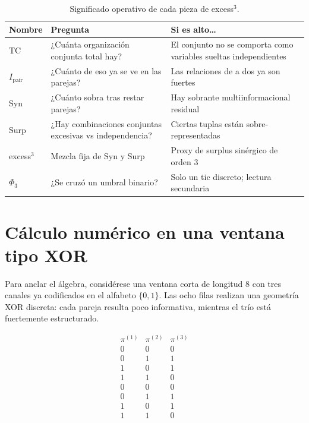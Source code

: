 \documentclass[11pt,a4paper]{article}
\begin{document}
\begin{table}[H]
\centering
\caption{Significado operativo de cada pieza de excess$^3$.}
\label{tab:piezas}
\small
\begin{tabularx}{\textwidth}{@{}>{\raggedright\arraybackslash}p{2.4cm} X X@{}}
\toprule
\textbf{Nombre} & \textbf{Pregunta} & \textbf{Si es alto\ldots} \\
\midrule
TC
  & ¿Cu\'anta organizaci\'on conjunta total hay?
  & El conjunto no se comporta como variables sueltas independientes \\
$I_{\mathrm{pair}}$
  & ¿Cu\'anto de eso ya se ve en las parejas?
  & Las relaciones de a dos ya son fuertes \\
Syn
  & ¿Cu\'anto sobra tras restar parejas?
  & Hay sobrante multiinformacional residual \\
Surp
  & ¿Hay combinaciones conjuntas excesivas vs independencia?
  & Ciertas tuplas est\'an sobre-representadas \\
excess$^3$
  & Mezcla fija de Syn y Surp
  & Proxy de surplus sin\'ergico de orden 3 \\
$\Phi_3$
  & ¿Se cruz\'o un umbral binario?
  & Solo un tic discreto; lectura secundaria \\
\bottomrule
\end{tabularx}
\end{table}

\section{C\'alculo num\'erico en una ventana tipo XOR}
\label{sec:xor}

Para anclar el \'algebra, consid\'erese una ventana corta de longitud $8$ con
tres canales ya codificados en el alfabeto $\{0,1\}$. Las ocho filas
realizan una geometr\'ia XOR discreta: cada pareja resulta poco
informativa, mientras el tr\'io est\'a fuertemente estructurado.

\begin{equation*}
\begin{array}{ccc}
\pi^{(1)} & \pi^{(2)} & \pi^{(3)} \\
\hline
0 & 0 & 0 \\
0 & 1 & 1 \\
1 & 0 & 1 \\
1 & 1 & 0 \\
0 & 0 & 0 \\
0 & 1 & 1 \\
1 & 0 & 1 \\
1 & 1 & 0
\end{array}
\end{equation*}
\end{document}
